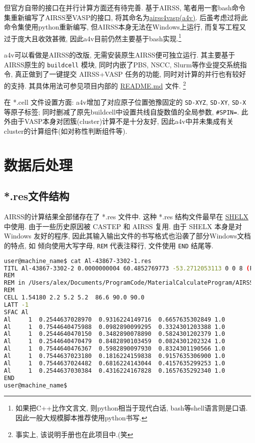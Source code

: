 \documentclass[a4paper, 10pt]{article}
\begin{document}
但官方自带的接口在并行计算方面还有待完善. 基于AIRSS, 笔者用一套bash命令集重新编写了AIRSS至VASP的接口, 将其命名为\href{https://github.com/kYangLi/airss4vasp}{airss4vasp(a4v)}. 后虽考虑过将此命令集使用python重新编写, 但AIRSS本身无法在Windows上运行, 而复写工程又过于庞大且收效甚微, 因此a4v目前仍然主要基于bash实现.\footnote{如果把C++比作文言文, 则python相当于现代白话, bash等shell语言则是口语. 因此一般大规模脚本推荐使用python书写.}

a4v可以看做是AIRSS的改版, 无需安装原生AIRSS便可独立运行. 其主要基于AIRSS原生的 \verb|buildcell| 模块, 同时内嵌了PBS, NSCC, Slurm等作业提交系统指令, 真正做到了一键提交 AIRSS+VASP 任务的功能, 同时对计算的并行也有较好的支持. 其具体用法可参见项目内部的 \href{https://github.com/kYangLi/airss4vasp/blob/master/README.md}{README.md} 文件. \footnote{事实上, 该说明手册也在此项目中.(笑} 

在 *.cell 文件设置方面: a4v增加了对应原子位置弛豫固定的 \verb|SD-XYZ|, \verb|SD-XY|, \verb|SD-X|等原子标签; 同时删减了原先buildcell中设置共线自旋数值的全局参数, \verb|#SPIN=|. 此外由于VASP本身对团簇(cluster)计算不是十分友好, 因此a4v中并未集成有关cluster的计算组件(如对称性判断组件等).

\newpage
\section{数据后处理}
\subsection{*.res文件结构}
AIRSS的计算结果全部储存在了 *.res 文件中. 这种 *.res 结构文件最早在 \href{https://strucbio.biologie.uni-konstanz.de/ccp4wiki/index.php/SHELXL}{SHELX} 中使用. 由于一些历史原因被 CASTEP 和 AIRSS 复用. 由于 SHELX 本身是对 Windows 友好的程序, 因此其输入输出文件的书写格式也沿袭了部分Windows文档的特点, 如 倾向使用大写字母, \verb|REM| 代表注释行, 文件使用 \verb|END| 结尾等.

\begin{lstlisting}[language={bash}]
user@machine_name$ cat Al-43867-3302-1.res
TITL Al-43867-3302-2 0.0000000004 60.4852769773 -53.2712053113 0 0 8 (P63/mmc) n - 1
REM
REM in /Users/alex/Documents/ProgramCode/MaterialCalculateProgram/AIRSS/airss-0.9/examples/1.1
REM
CELL 1.54180 2.2 5.2 5.2  86.6 90.0 90.0
LATT -1
SFAC Al 
Al     1  0.2544637028970  0.9316224149716  0.6657635302849 1.0
Al     1  0.7544640475988  0.0982890099295  0.3324301203388 1.0
Al     1  0.2544640470150  0.3482890078890  0.5824301202379 1.0
Al     1  0.2544640470479  0.8482890103459  0.0824301202324 1.0
Al     1  0.7544640476367  0.5982890097930  0.8324301190566 1.0
Al     1  0.7544637023180  0.1816224159838  0.9157635306900 1.0
Al     1  0.7544637024482  0.6816224143044  0.4157635299253 1.0
Al     1  0.2544637030384  0.4316224167828  0.1657635292340 1.0
END
user@machine_name$
\end{lstlisting}
\end{document}
